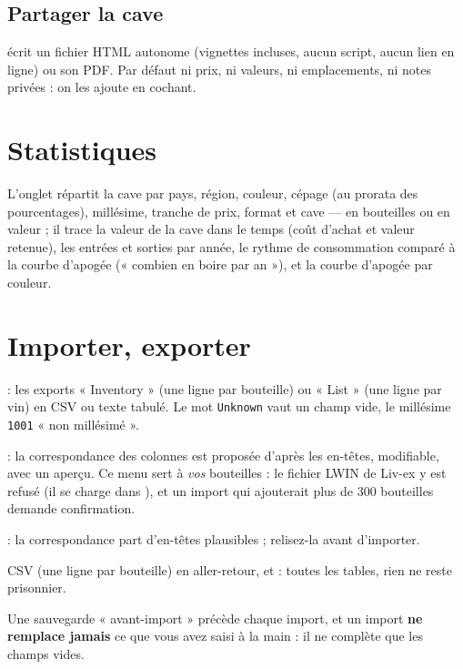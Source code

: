 \documentclass[11pt,a4paper]{article}
\begin{document}

\subsection{Partager la cave}
 écrit un fichier HTML autonome (vignettes incluses, aucun
script, aucun lien en ligne) ou son PDF. Par défaut ni prix, ni valeurs, ni emplacements, ni notes privées :
on les ajoute en cochant.


\section{Statistiques}
L'onglet  répartit la cave par pays, région, couleur, cépage (au prorata des
pourcentages), millésime, tranche de prix, format et cave — en bouteilles ou en valeur ; il trace la valeur
de la cave dans le temps (coût d'achat et valeur retenue), les entrées et sorties par année, le rythme de
consommation comparé à la courbe d'apogée (« combien en boire par an »), et la courbe d'apogée par couleur.


\section{Importer, exporter}
\label{sec:imports}
\begin{description}[style=nextline,leftmargin=1.2em]
  \item[CellarTracker]  : les exports « Inventory »
    (une ligne par bouteille) ou « List » (une ligne par vin) en CSV ou texte tabulé. Le mot \texttt{Unknown}
    vaut un champ vide, le millésime \texttt{1001} « non millésimé ».
  \item[Excel, CSV]  : la correspondance des colonnes est
    proposée d'après les en-têtes, modifiable, avec un aperçu. Ce menu sert à \emph{vos} bouteilles : le
    fichier LWIN de Liv-ex y est refusé (il se charge dans ), et un
    import qui ajouterait plus de 300 bouteilles demande confirmation.
  \item[Vivino]  : la correspondance part d'en-têtes plausibles ;
    relisez-la avant d'importer.
  \item[Vendémiaire] CSV (une ligne par bouteille) en aller-retour, et  : toutes les tables, rien ne reste prisonnier.
\end{description}
Une sauvegarde « avant-import » précède chaque import, et un import \textbf{ne remplace jamais} ce que
vous avez saisi à la main : il ne complète que les champs vides.
\end{document}
